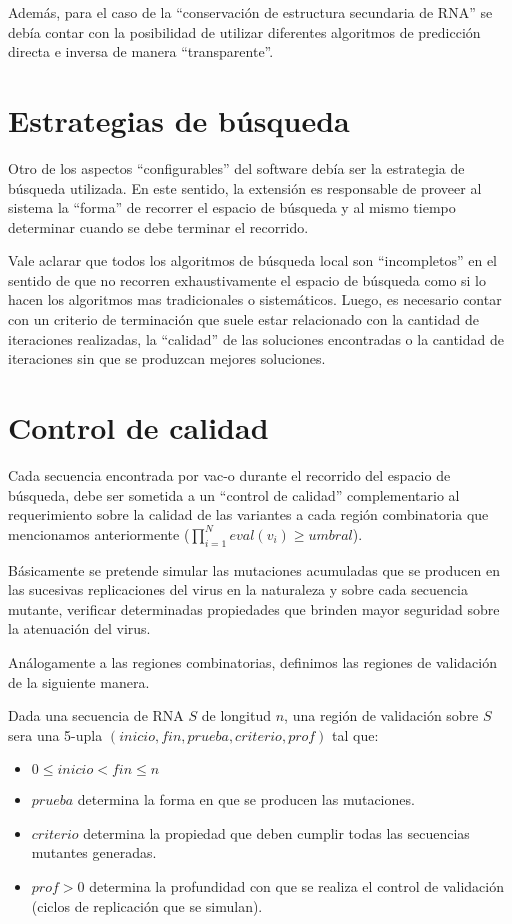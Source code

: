 Adem\'as, para el caso de la ``conservaci\'on de estructura secundaria de
\ac{RNA}'' se deb\'ia contar con la posibilidad de utilizar diferentes
algoritmos de predicci\'on directa e inversa de manera ``transparente''.

\section{Estrategias de b\'usqueda}

Otro de los aspectos ``configurables'' del software deb\'ia ser la estrategia
de b\'usqueda utilizada. En este sentido, la extensi\'on es responsable de
proveer al sistema la ``forma'' de recorrer el espacio de b\'usqueda y al mismo
tiempo determinar cuando se debe terminar el recorrido.

Vale aclarar que todos los algoritmos de b\'usqueda local son ``incompletos''
en el sentido de que no recorren exhaustivamente el espacio de b\'usqueda como
si lo hacen los algoritmos mas tradicionales o sistem\'aticos. Luego, es
necesario contar con un criterio de terminaci\'on que suele estar relacionado
con la cantidad de iteraciones realizadas, la ``calidad'' de las soluciones
encontradas o la cantidad de iteraciones sin que se produzcan mejores
soluciones.

\section{Control de calidad}

Cada secuencia encontrada por \ac{vac-o} durante el recorrido del espacio
de b\'usqueda, debe ser sometida a un ``control de calidad'' complementario al
requerimiento sobre la calidad de las variantes a cada regi\'on combinatoria
que mencionamos anteriormente ($\prod_{i=1}^{N} eval(v_{i}) \ge umbral$).

B\'asicamente se pretende simular las mutaciones acumuladas que se producen en
las sucesivas replicaciones del virus en la naturaleza y sobre cada secuencia
mutante, verificar determinadas propiedades que brinden mayor seguridad sobre la
atenuaci\'on del virus.

An\'alogamente a las regiones combinatorias, definimos las regiones de
validaci\'on de la siguiente manera.

\begin{definition}
Dada una secuencia de \ac{RNA} $S$ de longitud $n$, una regi\'on de validaci\'on
sobre $S$ sera una 5-upla $(inicio, fin, prueba, criterio, prof)$ tal que:
\begin{itemize}
 \item $0 \le inicio < fin \le n$
 \item $prueba$ determina la forma en que se producen las mutaciones.
 \item $criterio$ determina la propiedad que deben cumplir todas las secuencias
mutantes generadas.
 \item $prof>0$ determina la profundidad con que se realiza el control de
validaci\'on (ciclos de replicaci\'on que se simulan).
\end{itemize}
\end{definition}

